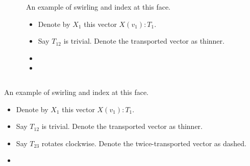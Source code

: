 \begin{frame}
\begin{columns}
\begin{column}{0.65\textwidth}
\vspace{12pt}
\begingroup
{}

\endgroup
\end{column}
\begin{column}{0.35\textwidth}
An example of \alert{swirling} and \alert{index} at this face.
\begin{itemize}
\item<1-> Denote by \( X_1 \) this vector \( X(v_1):T_1 \).
\item<1-> Say \( T_{12} \) is trivial. Denote the transported vector as thinner.
\item<1-> 
\item<1-> 
\end{itemize}
\end{column}
\end{columns}
\end{frame}

\begin{frame}
\begin{columns}
\begin{column}{0.65\textwidth}
\vspace{12pt}
\begingroup
{}

\endgroup
\end{column}
\begin{column}{0.35\textwidth}
An example of \alert{swirling} and \alert{index} at this face.
\begin{itemize}
\item<1-> Denote by \( X_1 \) this vector \( X(v_1):T_1 \).
\item<1-> Say \( T_{12} \) is trivial. Denote the transported vector as thinner.
\item<1-> Say \( T_{23} \) rotates clockwise. Denote the twice-transported vector as dashed.
\item<1-> 
\end{itemize}
\end{column}
\end{columns}
\end{frame}

